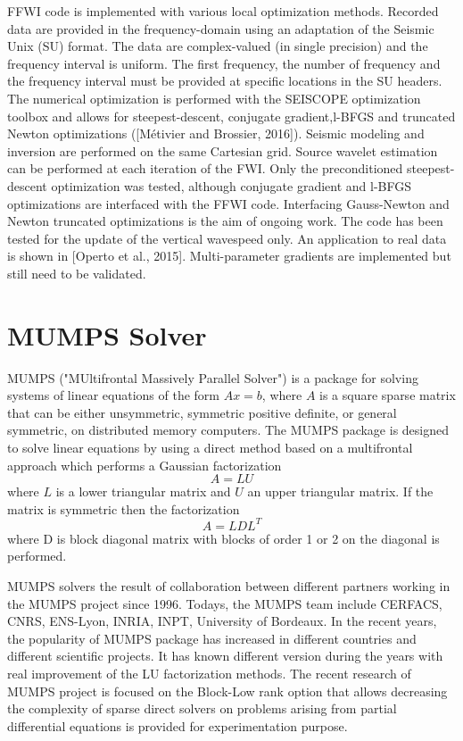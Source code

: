 FFWI code is implemented with various local optimization methods. Recorded data are provided in the frequency-domain using an adaptation of the Seismic Unix (SU) format. The data are complex-valued (in single precision) and the frequency interval is uniform. The first frequency, the number of frequency and the frequency interval must be provided at specific locations in the SU headers. The numerical optimization is performed with the SEISCOPE optimization toolbox and allows for steepest-descent, conjugate gradient,l-BFGS and truncated Newton optimizations ([M\'{e}tivier and Brossier, 2016]). Seismic modeling and inversion are performed on the same Cartesian grid. Source wavelet estimation can be performed at each iteration of the FWI. Only the preconditioned steepest-descent optimization was tested, although conjugate gradient and l-BFGS optimizations are interfaced with the FFWI code. Interfacing Gauss-Newton and Newton truncated optimizations is the aim of ongoing work. The code has been tested for the update of the vertical wavespeed only. An application to real data is shown in [Operto et al., 2015]. Multi-parameter gradients are implemented but still need to be validated.

\section{MUMPS Solver}
MUMPS ("MUltifrontal Massively Parallel Solver") is a package for solving systems of linear equations of the form $ Ax = b$, where $ A $ is a square sparse matrix that can be either unsymmetric, symmetric positive definite, or general symmetric, on distributed memory computers. The MUMPS package is designed to solve linear equations by using a direct method based on a multifrontal approach which performs a Gaussian factorization
$$ A = LU $$ 
where $ L $ is a lower triangular matrix and $ U $ an upper triangular matrix. If the matrix is symmetric then
the factorization
$$ A = LDL^{T}$$
where D is block diagonal matrix with blocks of order 1 or 2 on the diagonal is performed. 

MUMPS solvers the result of collaboration between different partners working in the MUMPS project since 1996. Todays, the MUMPS team include CERFACS, CNRS, ENS-Lyon, INRIA, INPT, University of Bordeaux. In the recent years, the popularity of MUMPS package has increased in different countries and different scientific projects. It has known different version during the years with real improvement of the LU factorization methods. The recent research of MUMPS project is focused on the Block-Low rank option that allows decreasing the complexity of sparse direct solvers on problems arising from partial differential equations is provided for experimentation purpose. 

